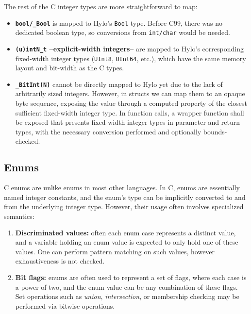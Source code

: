 The rest of the C integer types are more straightforward to map:
\begin{itemize}
    \item \textbf{\texttt{bool/\_Bool}} is mapped to Hylo's \texttt{Bool} type. Before C99, there was no dedicated boolean type, so conversions from \texttt{int/char} would be needed.
    \item \textbf{\texttt{(u)intN\_t} --explicit-width integers--} are mapped to Hylo's corresponding fixed-width integer types (\texttt{UInt8}, \texttt{UInt64}, etc.), which have the same memory layout and bit-width as the C types.
    \item \textbf{\texttt{\_BitInt(N)}} cannot be directly mapped to Hylo yet due to the lack of arbitrarily sized integers. However, in structs we can map them to an opaque byte sequence, exposing the value through a computed property of the closest sufficient fixed-width integer type. In function calls, a wrapper function shall be exposed that presents fixed-width integer types in parameter and return types, with the necessary conversion performed and optionally bounds-checked. 
\end{itemize} 

\subsection{Enums}
C enums are unlike enums in most other languages. In C, enums are essentially named integer constants, and the enum's type can be implicitly converted to and from the underlying integer type. However, their usage often involves specialized semantics:
\begin{enumerate}
    \item \textbf{Discriminated values:} often each enum case represents a distinct value, and a variable holding an enum value is expected to only hold one of these values. One can perform pattern matching on such values, however exhaustiveness is not checked.
    \item \textbf{Bit flags:} enums are often used to represent a set of flags, where each case is a power of two, and the enum value can be any combination of these flags. Set operations such as \textit{union}, \textit{intersection}, or membership checking may be performed via bitwise operations. 
\end{enumerate}

